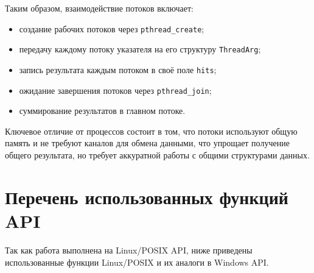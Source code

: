 Таким образом, взаимодействие потоков включает:
\begin{itemize}
    \item создание рабочих потоков через \texttt{pthread\_create};
    \item передачу каждому потоку указателя на его структуру \texttt{ThreadArg};
    \item запись результата каждым потоком в своё поле \texttt{hits};
    \item ожидание завершения потоков через \texttt{pthread\_join};
    \item суммирование результатов в главном потоке.
\end{itemize}

Ключевое отличие от процессов состоит в том, что потоки используют общую память и
не требуют каналов для обмена данными, что упрощает получение общего результата, но
требует аккуратной работы с общими структурами данных.

\newpage
\section{Перечень использованных функций API}

Так как работа выполнена на Linux/POSIX API, ниже приведены использованные функции
Linux/POSIX и их аналоги в Windows API.

